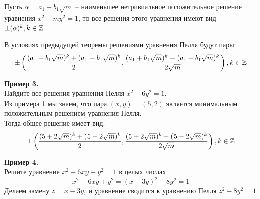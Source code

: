 \begin{theorem}
    Пусть $\alpha = a_1 + b_{1}\sqrt{m}$ -- наименьшее нетривиальное положительное решение уравнения $x^2 - my^2 = 1$, то все решения этого уравнения имеют вид $\pm(\alpha)^k, k \in \mathbb{Z}$.
\end{theorem}

\begin{corollary}
    В условиях предыдущей теоремы решениями уравнения Пелля будут пары:
    $$
        \pm \left( \frac{(a_1 + b_1\sqrt{m})^k + (a_1 - b_1\sqrt{m})^k}{2}, \frac{(a_1 + b_1\sqrt{m})^k - (a_1 - b_1\sqrt{m})^k}{2\sqrt{m}} \right), k \in \mathbb{Z}
    $$
\end{corollary}

\textbf{Пример 3.}\\
Найдите все решения уравнения Пелля $x^2 - 6y^2 = 1$.\\
Из примера 1 мы знаем, что пара $(x, y) = (5, 2)$ является минимальным положительным решением уравнения Пелля.\\
Тогда общее решение имеет вид:
    $$
        \pm \left( \frac{(5 + 2\sqrt{m})^k + (5 - 2\sqrt{m})^k}{2}, \frac{(5 + 2\sqrt{m})^k - (5 - 2\sqrt{m})^k}{2\sqrt{m}} \right), k \in \mathbb{Z}
    $$

\textbf{Пример 4.}\\
Решите уравнение $x^2 - 6xy + y^2 = 1$ в целых числах\\
$$
    x^2 - 6xy + y^2 = (x - 3y)^2 - 8y^2 = 1
$$
Делаем замену $z = x - 3y$, и уравнение сводится к уравнению Пелля $z^2 -8y^2 = 1$
